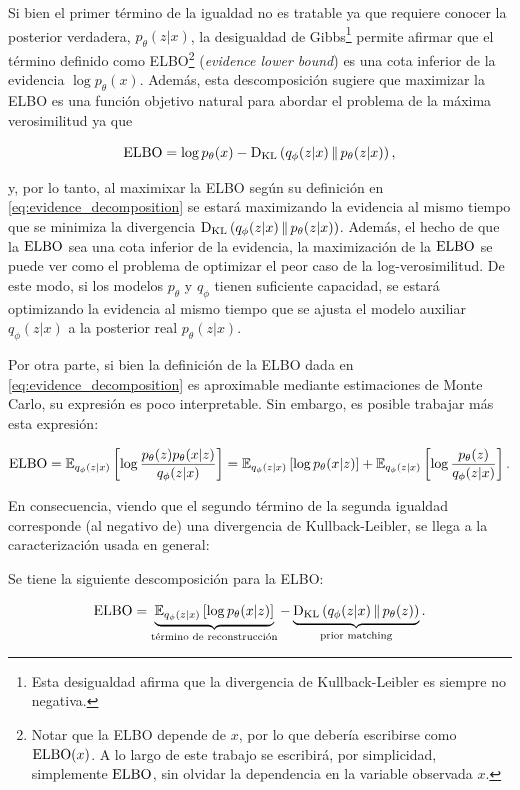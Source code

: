 Si bien el primer término de la igualdad no es tratable ya que requiere conocer la posterior verdadera, $p_\theta(z|x)$, la desigualdad de Gibbs\footnote{Esta desigualdad afirma que la divergencia de Kullback-Leibler es siempre no negativa.} permite afirmar que el término definido como ELBO\footnote{Notar que la ELBO depende de $x$, por lo que debería escribirse como $\operatorname{ELBO}(x)$. A lo largo de este trabajo se escribirá, por simplicidad, simplemente $\operatorname{ELBO}$, sin olvidar la dependencia en la variable observada $x$.} (\textit{evidence lower bound}) es una cota inferior de la evidencia $\log p_\theta(x)$. Además, esta descomposición sugiere que maximizar la ELBO es una función objetivo natural para abordar el problema de la máxima verosimilitud ya que

\begin{equation*}
    \operatorname{ELBO} = \log p_\theta(x) - \operatorname{D_{KL}}\left(q_\phi(z|x)\,\|\,p_\theta(z|x)\right),
\end{equation*}

y, por lo tanto, al maximixar la ELBO según su definición en \eqref{eq:evidence_decomposition} se estará maximizando la evidencia al mismo tiempo que se minimiza la divergencia $\operatorname{D_{KL}}\left(q_\phi(z|x)\,\|\,p_\theta(z|x)\right)$. Además, el hecho de que la $\operatorname{ELBO}$ sea una cota inferior de la evidencia, la maximización de la $\operatorname{ELBO}$ se puede ver como el problema de optimizar el peor caso de la log-verosimilitud. De este modo, si los modelos $p_\theta$ y $q_\phi$ tienen suficiente capacidad, se estará optimizando la evidencia al mismo tiempo que se ajusta el modelo auxiliar $q_\phi(z|x)$ a la posterior real $p_\theta(z|x)$.

Por otra parte, si bien la definición de la ELBO dada en \eqref{eq:evidence_decomposition} es aproximable mediante estimaciones de Monte Carlo, su expresión es poco interpretable. Sin embargo, es posible trabajar más esta expresión:

\begin{equation*}
    \operatorname{ELBO}
    = \mathbb{E}_{q_\phi(z|x)}\left[\log\frac{p_\theta(z)p_\theta(x|z)}{q_\phi(z|x)}\right]
    = \mathbb{E}_{q_\phi(z|x)}\left[\log p_\theta(x|z)\right] + \mathbb{E}_{q_\phi(z|x)}\left[\log\frac{p_\theta(z)}{q_\phi(z|x)}\right].
\end{equation*}

En consecuencia, viendo que el segundo término de la segunda igualdad corresponde (al negativo de) una divergencia de Kullback-Leibler, se llega a la caracterización usada en general:

\begin{prop}
    Se tiene la siguiente descomposición para la ELBO:

    \begin{equation}
        \label{eq:elbo_decomposition}
        \operatorname{ELBO}
        = \underbrace{\mathbb{E}_{q_\phi(z|x)}\left[\log p_\theta(x|z)\right]}_{\text{término de reconstrucción}}
        - \underbrace{\operatorname{D_{KL}}\left(q_\phi(z|x)\,\|\,p_\theta(z)\right)}_{\text{prior matching}}.
    \end{equation}
\end{prop}

